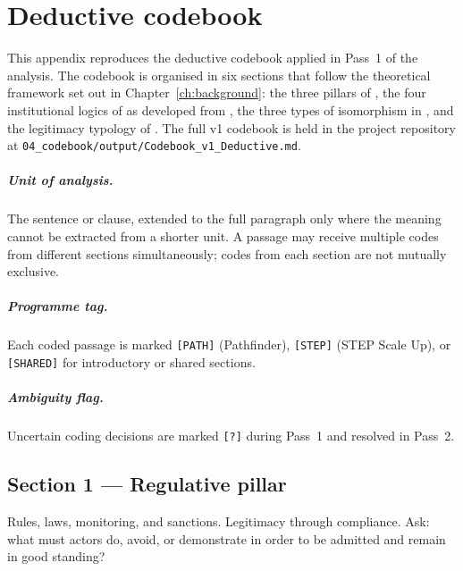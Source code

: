 \chapter{Deductive codebook}
\label{app:codebook-deductive}

This appendix reproduces the deductive codebook applied in Pass~1 of the
analysis. The codebook is organised in six sections that follow the
theoretical framework set out in Chapter~\ref{ch:background}: the three
pillars of \textcite{scott2014institutions}, the four institutional
logics of \textcite{thornton2012institutional} as developed from
\textcite{friedland1991bringing}, the three types of isomorphism in
\textcite{dimaggio1983iron}, and the legitimacy typology of
\textcite{suchman1995managing}. The full v1 codebook is held in the
project repository at \texttt{04\_codebook/output/Codebook\_v1\_Deductive.md}.

\paragraph{Unit of analysis.} The sentence or clause, extended to the
full paragraph only where the meaning cannot be extracted from a
shorter unit. A passage may receive multiple codes from different
sections simultaneously; codes from each section are not mutually
exclusive.

\paragraph{Programme tag.} Each coded passage is marked \texttt{[PATH]}
(Pathfinder), \texttt{[STEP]} (STEP Scale Up), or \texttt{[SHARED]}
for introductory or shared sections.

\paragraph{Ambiguity flag.} Uncertain coding decisions are marked
\texttt{[?]} during Pass~1 and resolved in Pass~2.

\section*{Section 1 --- Regulative pillar}

Rules, laws, monitoring, and sanctions. Legitimacy through compliance.
Ask: what must actors do, avoid, or demonstrate in order to be admitted
and remain in good standing?


